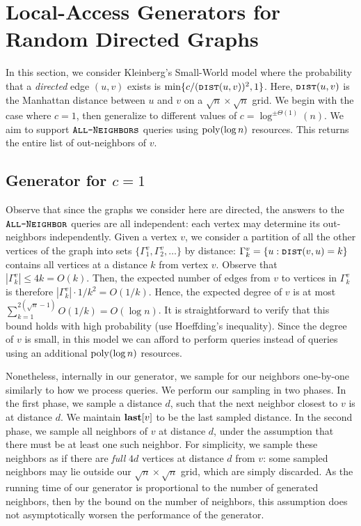\section{Local-Access Generators for Random Directed Graphs}
\label{sec:small_world}

In this section, we consider Kleinberg's Small-World model \cite{kleinberg, klein}
where the probability that a \emph{directed} edge $(u,v)$ exists is $\min\{c/(\texttt{\textsc{dist}}(u,v))^2, 1\}$.
Here, $\texttt{\textsc{dist}}(u,v)$ is the Manhattan distance between $u$ and $v$ on a $\sqrt n\times\sqrt n$ grid.
We begin with the case where $c = 1$, then generalize to different values of $c = \log^{\pm\Theta(1)}(n)$. 
We aim to support $\texttt{\textsc{All-Neighbors}}$ queries using $\mathrm{poly}(\log n)$ resources. 
This returns the entire list of out-neighbors of $v$.

\subsection{Generator for $c=1$}

Observe that since the graphs we consider here are directed, the answers to the $\texttt{\textsc{All-Neighbor}}$ queries are all independent: each vertex may determine its out-neighbors independently.
Given a vertex $v$, we consider a partition of all the other vertices of the graph into sets $\{\Gamma^v_1, \Gamma^v_2,\ldots\}$ by distance: $\Gamma^v_k = \{u: \texttt{\textsc{dist}}(v,u) = k\}$ contains all vertices at a distance $k$ from vertex $v$. Observe that $|\Gamma^v_k|\leq 4k = O(k)$. Then, the expected number of edges from $v$ to vertices in $\Gamma^v_k$ is therefore $|\Gamma^v_k|\cdot 1/k^2 = O(1/k)$.
Hence, the expected degree of $v$ is at most $\sum_{k=1}^{2(\sqrt{n}-1)}O(1/k) = O(\log n)$.
It is straightforward to verify that this bound holds with high probability (use Hoeffding's inequality).
Since the degree of $v$ is small, in this model we can afford to perform  queries instead of  queries using an additional $\mathrm{poly}(\log n)$ resources.

Nonetheless, internally in our generator, we sample for our neighbors one-by-one similarly to how we process  queries.
We perform our sampling in two phases.
In the first phase, we sample a distance $d$, such that the next neighbor closest to $v$ is at distance $d$.
We maintain $\mathbf{last}[v]$ to be the last sampled distance.
In the second phase, we sample all neighbors of $v$ at distance $d$, under the assumption that there must be at least one such neighbor.
For simplicity, we sample these neighbors as if there are \emph{full} $4d$ vertices at distance $d$ from $v$:
some sampled neighbors may lie outside our $\sqrt n\times\sqrt n$ grid, which are simply discarded.
As the running time of our generator is proportional to the number of generated neighbors,
then by the bound on the number of neighbors, this assumption does not asymptotically worsen the performance of the generator.

